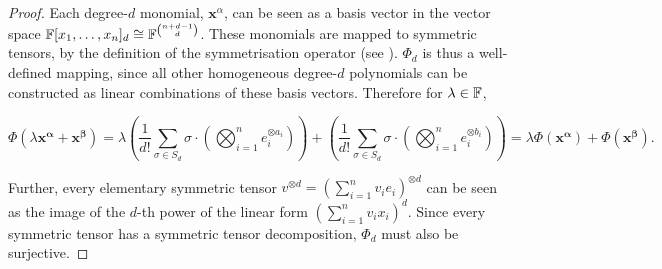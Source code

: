 \documentclass[../Lael_John_MasterThesis_Draft.tex]{subfiles}
\begin{document}
\begin{proof}
    Each degree-$d$ monomial, $\mathbf{x}^{\alpha}$, can be seen as a basis vector in the vector space $\mathbb{F}[x_1, \ldots, x_n]_d \cong \mathbb{F}^{\binom{n+d-1}{d}}$. These monomials are mapped to symmetric tensors, by the definition of the symmetrisation operator (see ). $\Phi_d$ is thus a well-defined mapping, since all other homogeneous degree-$d$ polynomials can be constructed as linear combinations of these basis vectors. Therefore for $\lambda \in \mathbb{F}$,
    
    $$\Phi(\lambda \mathbf{x^{\alpha}} + \mathbf{x^{\beta}}) = \lambda \left( \frac{1}{d!}\sum_{\sigma \in S_d} \sigma \cdot (\bigotimes_{i=1}^n e_i^{\otimes a_i})\right) + \left( \frac{1}{d!}\sum_{\sigma \in S_d} \sigma \cdot (\bigotimes_{i=1}^n e_i^{\otimes b_i})\right) = \lambda\Phi(\mathbf{x^{\alpha}}) + \Phi(\mathbf{x^{\beta}}). $$

    Further, every elementary symmetric tensor $v^{\otimes d} = (\sum_{i=1}^{n}v_ie_i)^{\otimes d}$ can be seen as the image of the $d$-th power of the linear form $\left(\sum_{i=1}^{n} v_ix_i \right)^d$. Since every symmetric tensor has a symmetric tensor decomposition, $\Phi_d$ must also be surjective. 
    


\end{proof}
\end{document}
